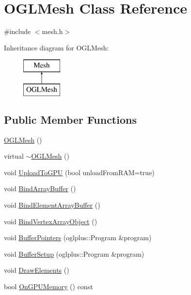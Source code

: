 \hypertarget{class_o_g_l_mesh}{}\section{O\+G\+L\+Mesh Class Reference}
\label{class_o_g_l_mesh}


{\ttfamily \#include $<$mesh.\+h$>$}

Inheritance diagram for O\+G\+L\+Mesh\+:\begin{figure}[H]
\begin{center}
\leavevmode
\includegraphics[height=2.000000cm]{class_o_g_l_mesh}
\end{center}
\end{figure}
\subsection*{Public Member Functions}
\begin{DoxyCompactItemize}
\item 
\hyperlink{class_o_g_l_mesh_ab16637bce9f72105cbc661949926d4fd}{O\+G\+L\+Mesh} ()
\item 
virtual \hyperlink{class_o_g_l_mesh_a81d6ba27b650afaf6dd67df8508068c1}{$\sim$\+O\+G\+L\+Mesh} ()
\item 
void \hyperlink{class_o_g_l_mesh_a7d36e3fe07a85a0d50eced4e4ed9105f}{Upload\+To\+G\+P\+U} (bool unload\+From\+R\+A\+M=true)
\item 
void \hyperlink{class_o_g_l_mesh_a1a484d2250debeda7049192f35ce8203}{Bind\+Array\+Buffer} ()
\item 
void \hyperlink{class_o_g_l_mesh_ac8be151a624619d6710717b34b2a974d}{Bind\+Element\+Array\+Buffer} ()
\item 
void \hyperlink{class_o_g_l_mesh_a1142d41844f6c3a094ef6c7a1be95df7}{Bind\+Vertex\+Array\+Object} ()
\item 
void \hyperlink{class_o_g_l_mesh_a3811dabaecf72be0c5c106bf9fccc020}{Buffer\+Pointers} (oglplus\+::\+Program \&program)
\item 
void \hyperlink{class_o_g_l_mesh_a88a57d48eabc18f11d2ec6938075ec41}{Buffer\+Setup} (oglplus\+::\+Program \&program)
\item 
void \hyperlink{class_o_g_l_mesh_a5b4182b63fe4f4cbd11d525526eefbb2}{Draw\+Elements} ()
\item 
bool \hyperlink{class_o_g_l_mesh_ac83aaa629d5033acbe69f9a98703d6cf}{On\+G\+P\+U\+Memory} () const 
\end{DoxyCompactItemize}
